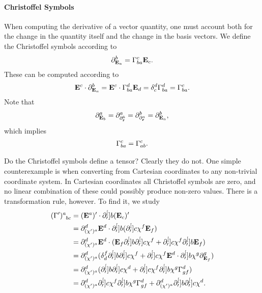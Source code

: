 \paragraph{Christoffel Symbols}
When computing the derivative of a vector quantity, one must account both for the change in the quantity itself and the change in the basis vectors. We define the Christoffel symbols according to
\begin{align*}
	\del{b}{\tb{a}} = \chris{c}{b}{a}\tb{c}.
\end{align*}
These can be computed according to
\begin{align*}
	\db{c}\cdot\del{b}{\tb{a}} = \db{c}\cdot\chris{d}{b}{a}\tb{d} = \kdelta{d}{c}\chris{d}{b}{a} = \chris{c}{b}{a}.
\end{align*}
Note that
\begin{align*}
	\partial^{a}_{\vb{E}_{b}} = \partial^{a}_{\partial^{b}_{\vb{r}}} = \partial^{b}_{\partial^{a}_{\vb{r}}} = \partial^{b}_{\vb{E}_{a}},
\end{align*}
which implies
\begin{align*}
	\chris{c}{b}{a} = \chris{c}{a}{b}.
\end{align*}

Do the Christoffel symbols define a tensor? Clearly they do not. One simple counterexample is when converting from Cartesian coordinates to any non-trivial coordinate system. In Cartesian coordinates all Christoffel symbols are zero, and no linear combination of these could possibly produce non-zero values. There is a transformation rule, however. To find it, we study
\begin{align*}
	\tensor{(\Gamma^{\prime})}{^{a}_{bc}} &= (\db{a})^{\prime}\cdot\del[\prime]{b}{(\tb{c})^{\prime}} \\
	                                      &= \del{d}{(\chi')^{a}}\db{d}\cdot\del[\prime]{b}{(\del[\prime]{c}{\chi^{f}}\tb{f})} \\
	                                      &= \del{d}{(\chi')^{a}}\db{d}\cdot(\tb{f}\del[\prime]{b}{\del[\prime]{c}{\chi^{f}}} + \del[\prime]{c}{\chi^{f}}\del[\prime]{b}{\tb{f}}) \\
	                                      &= \del{d}{(\chi')^{a}}(\kdelta{f}{d}\del[\prime]{b}{\del[\prime]{c}{\chi^{f}}} + \del[\prime]{c}{\chi^{f}}\db{d}\cdot\del[\prime]{b}{\chi^{g}}\del{g}{\tb{f}}) \\
	                                      &= \del{d}{(\chi')^{a}}(\del[\prime]{b}{\del[\prime]{c}{\chi^{d}}} + \del[\prime]{c}{\chi^{f}}\del[\prime]{b}{\chi^{g}}\chris{d}{g}{f}) \\
	                                      &= \del{d}{(\chi')^{a}}\del[\prime]{c}{\chi^{f}}\del[\prime]{b}{\chi^{g}}\chris{d}{g}{f} + \del{d}{(\chi')^{a}}\del[\prime]{b}{\del[\prime]{c}{\chi^{d}}}.
\end{align*}

